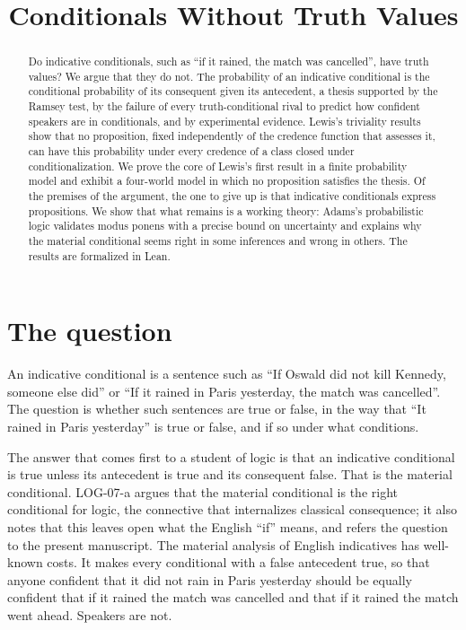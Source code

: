 \documentclass{situationist-preprint}
\title{Conditionals Without Truth Values}
\begin{document}
\maketitle

\begin{abstract}
Do indicative conditionals, such as \enquote{if it rained, the match was cancelled}, have truth values? We argue that they do not. The probability of an indicative conditional is the conditional probability of its consequent given its antecedent, a thesis supported by the Ramsey test, by the failure of every truth-conditional rival to predict how confident speakers are in conditionals, and by experimental evidence. Lewis's triviality results show that no proposition, fixed independently of the credence function that assesses it, can have this probability under every credence of a class closed under conditionalization. We prove the core of Lewis's first result in a finite probability model and exhibit a four-world model in which no proposition satisfies the thesis. Of the premises of the argument, the one to give up is that indicative conditionals express propositions. We show that what remains is a working theory: Adams's probabilistic logic validates modus ponens with a precise bound on uncertainty and explains why the material conditional seems right in some inferences and wrong in others. The results are formalized in Lean.
\end{abstract}

\section{The question}

An indicative conditional is a sentence such as \enquote{If Oswald did not kill Kennedy, someone else did} or \enquote{If it rained in Paris yesterday, the match was cancelled}. The question is whether such sentences are true or false, in the way that \enquote{It rained in Paris yesterday} is true or false, and if so under what conditions.

The answer that comes first to a student of logic is that an indicative conditional is true unless its antecedent is true and its consequent false. That is the material conditional. LOG-07-a argues that the material conditional is the right conditional for logic, the connective that internalizes classical consequence; it also notes that this leaves open what the English \enquote{if} means, and refers the question to the present manuscript. The material analysis of English indicatives has well-known costs. It makes every conditional with a false antecedent true, so that anyone confident that it did not rain in Paris yesterday should be equally confident that if it rained the match was cancelled and that if it rained the match went ahead. Speakers are not.
\end{document}
